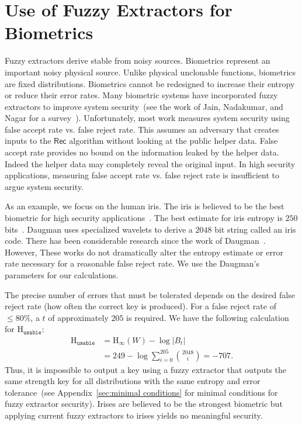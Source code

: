\documentclass[11pt]{article}
\newcommand{\apref}[1]{\mbox{Appendix~\ref{#1}}}
\newcommand{\class}[1]{{\ensuremath{\mathsf{#1}}}}
\newcommand{\rec}{\ensuremath{\class{Rec}}\xspace}
\newcommand{\Hoo}{\mathrm{H}_\infty}
\newcommand{\Huse}{\mathrm{H}_{\mathtt{usable}}}
\begin{document}
\appendix

\section{Use of Fuzzy Extractors for Biometrics}
Fuzzy extractors derive stable from noisy sources.  Biometrics represent an important noisy physical source.  Unlike physical unclonable functions, biometrics are fixed distributions.  Biometrics cannot be redesigned to  increase their entropy or reduce their error rates.  Many biometric systems have incorporated fuzzy extractors to improve system security~(see the work of Jain, Nadakumar, and Nagar for a survey~\cite{jain2008biometric}).  Unfortunately, most work measures system security using false accept rate vs. false reject rate.  This assumes an adversary that creates inputs to the \rec algorithm without looking at the public helper data.  False accept rate provides no bound on the information leaked by the helper data.  Indeed the helper data may completely reveal the original input.  In high security applications, measuring false accept rate vs. false reject rate is insufficient to argue system security.  

\label{sec:iris no key}
As an example, we focus on the human iris.  The iris is believed to be the best biometric for high security applications~\cite{prabhakar2003biometric}.  The best estimate for iris entropy is $250$ bits~\cite{daugman2004}.  Daugman uses specialized wavelets to derive a $2048$ bit string called an iris code.  There has been considerable research since the work of Daugman~\cite{daugman2004}.  However, These works do not dramatically alter the entropy estimate or error rate necessary for a reasonable false reject rate.  We use the Daugman's parameters for our calculations.

The precise number of errors that must be tolerated depends on the desired false reject rate (how often the correct key is produced).  For a false reject rate of $\le 80\%$, a $t$ of approximately $205$ is required.%
We have the following calculation for $\Huse$:
\begin{align*}
\Huse &= \Hoo(W) - \log |B_t|\\
&= 249 - \log \sum_{i=0}^{205} {2048 \choose i} = -707.
\end{align*}
Thus, it is impossible to output a key using a fuzzy extractor that outputs the same strength key for all distributions with the same entropy and error tolerance~(see \apref{sec:minimal conditions} for minimal conditions for fuzzy extractor security).
Irises are believed to be the strongest biometric but applying current fuzzy extractors to irises yields no meaningful security.
\end{document}
